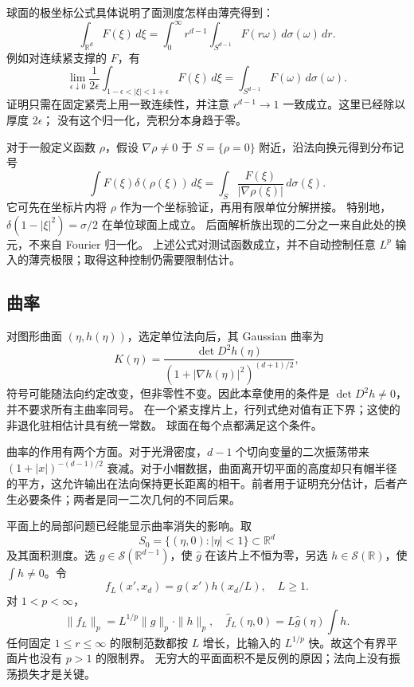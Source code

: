 \ProseParagraphBreak
球面的极坐标公式具体说明了面测度怎样由薄壳得到：
\[
 \int_{\mathbb R^d}F(\xi)\,d\xi
 =\int_0^\infty r^{d-1}
       \int_{S^{d-1}}F(r\omega)\,d\sigma(\omega)\,dr.
\]
例如对连续紧支撑的 \(F\)，有
\[
 \lim_{\epsilon\downarrow0}
 \frac1{2\epsilon}\int_{1-\epsilon<|\xi|<1+\epsilon}F(\xi)\,d\xi
 =\int_{S^{d-1}}F(\omega)\,d\sigma(\omega).
\]
证明只需在固定紧壳上用一致连续性，并注意
\(r^{d-1}\to1\) 一致成立。这里已经除以厚度 \(2\epsilon\)；
没有这个归一化，壳积分本身趋于零。

\ProseParagraphBreak
对于一般定义函数 \(\rho\)，假设 \(\nabla\rho\neq0\) 于
\(S=\{\rho=0\}\) 附近，沿法向换元得到分布记号
\[
 \int F(\xi)\delta(\rho(\xi))\,d\xi
 =\int_S\frac{F(\xi)}{|\nabla\rho(\xi)|}\,d\sigma(\xi).
\]
它可先在坐标片内将 \(\rho\) 作为一个坐标验证，再用有限单位分解拼接。
特别地，
\(\delta(1-|\xi|^2)=\sigma/2\) 在单位球面上成立。
后面解析族出现的二分之一来自此处的换元，不来自 Fourier 归一化。
上述公式对测试函数成立，并不自动控制任意 \(L^p\) 输入的薄壳极限；取得这种控制仍需要限制估计。

\subsection{曲率}
\label{b2:subsec:230103}

对图形曲面 \((\eta,h(\eta))\)，选定单位法向后，其 Gaussian 曲率为
\[
 K(\eta)=\frac{\det D^2h(\eta)}
                 {(1+|\nabla h(\eta)|^2)^{(d+1)/2}},
\]
符号可能随法向约定改变，但非零性不变。因此本章使用的条件是
\(\det D^2h\neq0\)，并不要求所有主曲率同号。
在一个紧支撑片上，行列式绝对值有正下界；这使的非退化驻相估计具有统一常数。
球面在每个点都满足这个条件。

\ProseParagraphBreak
曲率的作用有两个方面。对于光滑密度，\(d-1\) 个切向变量的二次振荡带来
\((1+|x|)^{-(d-1)/2}\) 衰减。对于小帽数据，曲面离开切平面的高度却只有帽半径的平方，这允许输出在法向保持更长距离的相干。前者用于证明充分估计，后者产生必要条件；两者是同一二次几何的不同后果。

\ProseParagraphBreak
平面上的局部问题已经能显示曲率消失的影响。取
\[
 S_0=\{(\eta,0):|\eta|<1\}\subset\mathbb R^d
\]
及其面积测度。选 \(g\in\mathcal S(\mathbb R^{d-1})\)，使
\(\widehat g\) 在该片上不恒为零，另选 \(h\in\mathcal S(\mathbb R)\)，使
\(\int h\neq0\)。令
\[
 f_L(x',x_d)=g(x')h(x_d/L),\quad L\geq1.
\]
对 \(1<p<\infty\)，
\[
 \|f_L\|_p=L^{1/p}\|g\|_p\cdot\|h\|_p,\quad
 \widehat f_L(\eta,0)=L\widehat g(\eta)\int h.
\]
任何固定 \(1\leq r\leq\infty\) 的限制范数都按 \(L\) 增长，比输入的
\(L^{1/p}\) 快。故这个有界平面片也没有 \(p>1\) 的限制界。
无穷大的平面面积不是反例的原因；法向上没有振荡损失才是关键。


